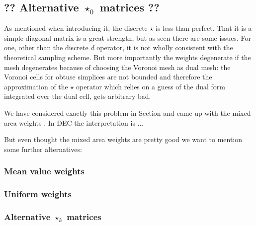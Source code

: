 \subsection{?? Alternative $\star_0$ matrices ??}
As mentioned when introducing it, the discrete $\star$ is less than perfect. That it is a simple diagonal matrix is a great strength, but as seen there are some issues. For one, other than the discrete $d$ operator, it is not wholly consistent with the theoretical sampling scheme. But more importantly the weights degenerate if the mesh degenerates because of choosing the Voronoi mesh as dual mesh: the Voronoi cells for obtuse simplices are not bounded and therefore the approximation of the $\star$ operator which relies on a guess of the dual form integrated over the dual cell, gets arbitrary bad.

We have considered exactly this problem in Section  and came up with the mixed area weights . In DEC the interpretation is ...

But even thought the mixed area weights are pretty good we want to mention some further alternatives:

\subsubsection{Mean value weights}

\subsubsection{Uniform weights}

\subsubsection{Alternative $\star_k$ matrices}
